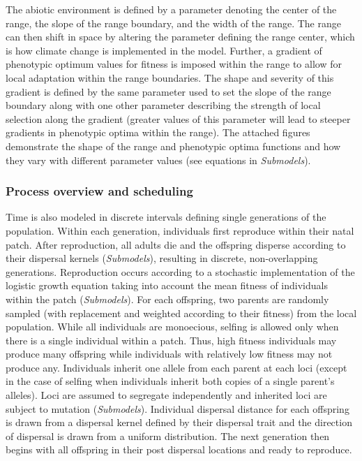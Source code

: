 \documentclass[11pt, oneside]{article}
\begin{document}
The abiotic environment is defined by a parameter denoting the center of the range, the slope of the range boundary, and the width of the range. The range can then shift in space by altering the parameter defining the range center, which is how climate change is implemented in the model. Further, a gradient of phenotypic optimum values for fitness is imposed within the range to allow for local adaptation within the range boundaries. The shape and severity of this gradient is defined by the same parameter used to set the slope of the range boundary along with one other parameter describing the strength of local selection along the gradient (greater values of this parameter will lead to steeper gradients in phenotypic optima within the range). The attached figures demonstrate the shape of the range and phenotypic optima functions and how they vary with different parameter values (see equations in \textit{Submodels}).

\subsubsection{Process overview and scheduling}
Time is also modeled in discrete intervals defining single generations of the population. Within each generation, individuals first reproduce within their natal patch. After reproduction, all adults die and the offspring disperse according to their dispersal kernels (\textit{Submodels}), resulting in discrete, non-overlapping generations. Reproduction occurs according to a stochastic implementation of the logistic growth equation taking into account the mean fitness of individuals within the patch (\textit{Submodels}). For each offspring, two parents are randomly sampled (with replacement and weighted according to their fitness) from the local population. While all individuals are monoecious, selfing is allowed only when there is a single individual within a patch. Thus, high fitness individuals may produce many offspring while individuals with relatively low fitness may not produce any. Individuals inherit one allele from each parent at each loci (except in the case of selfing when individuals inherit both copies of a single parent's alleles). Loci are assumed to segregate independently and inherited loci are subject to mutation (\textit{Submodels}). Individual dispersal distance for each offspring is drawn from a dispersal kernel defined by their dispersal trait and the direction of dispersal is drawn from a uniform distribution. The next generation then begins with all offspring in their post dispersal locations and ready to reproduce. 
\end{document}
